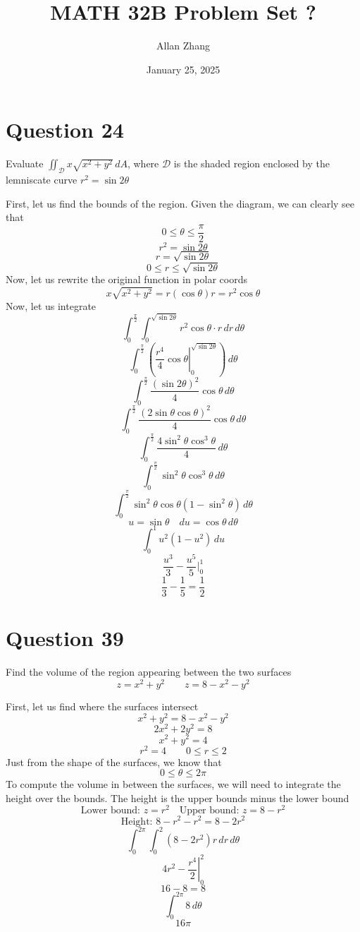\documentclass[hidelinks]{article}
\title{\textbf{MATH 32B Problem Set ?}}
\author{Allan Zhang}
\date{January 25, 2025}
\begin{document}
\hypersetup{bookmarksnumbered=true,}
\pagecolor{white}
\color{black}
\maketitle

\section{Question 24}
Evaluate $\iint_{\mathcal{D}} x \sqrt{x^2+y^2} \, dA$, where $\mathcal{D}$ is the shaded region enclosed by the lemniscate curve $r^2 = \sin2\theta$
\vspace{0.2cm}

First, let us find the bounds of the region. Given the diagram, we can clearly see that 
\[
    0 \leq \theta \leq \frac{\pi}{2}
\]
\[
    r^2 = \sin2\theta
\]
\[
    r = \sqrt{\sin2\theta} 
\]
\[
    0 \leq r \leq \sqrt{\sin2\theta}
\]
Now, let us rewrite the original function in polar coords
\[
    x\sqrt{x^2+y^2} = r(\cos\theta) r = r^2 \cos\theta
\]
Now, let us integrate
\[
    \int_0^{\frac{\pi}{2}} \int_0^{\sqrt{\sin2\theta}} r^2 \cos\theta \cdot r \, dr \, d \theta
\]
\[
    \int_0^{\frac{\pi}{2}} \left ( \left . \frac{r^4}{4} \cos\theta \right |_0^{\sqrt{\sin2\theta}}  \right ) \, d \theta
\]
\[
    \int_0^{\frac{\pi}{2}} \frac{(\sin2\theta)^2}{4} \cos\theta \, d \theta
\]
\[ 
    \int_0^{\frac{\pi}{2}} \frac{(2\sin\theta\cos\theta)^2}{4} \cos\theta \, d \theta
\]
\[ 
    \int_0^{\frac{\pi}{2}} \frac{4\sin^2\theta\cos^3\theta}{4} \, d \theta
\]
\[ 
    \int_0^{\frac{\pi}{2}} \sin^2\theta\cos^3\theta \, d \theta
\]
\[
    \int_0^{\frac{\pi}{2}} \sin^2\theta\cos\theta(1-\sin^2\theta) \, d \theta
\]
\[
    u = \sin\theta \quad du = \cos\theta \, d\theta
\]
\[
    \int_0^1 u^2 (1-u^2) \, du
\]
\[
    \frac{u^3}{3} - \frac{u^5}{5} \Big |_0^1
\]
\[
    \frac{1}{3} - \frac{1}{5} = \frac{1}{2}
\]
\newpage
\section{Question 39}
Find the volume of the region appearing between the two surfaces
\[
    z = x^2+y^2 \quad \quad z = 8 - x^2-y^2
\]
\vspace{0.2cm}

First, let us find where the surfaces intersect
\[
    x^2+y^2 = 8 - x^2-y^2
\]
\[
    2x^2+2y^2 = 8
\]
\[
    x^2+y^2 = 4
\]
\[
    r^2 = 4 \quad \quad 0 \leq r \leq 2
\]
Just from the shape of the surfaces, we know that
\[
    0 \leq \theta \leq 2\pi
\]
To compute the volume in between the surfaces, we will need to integrate the height over the bounds. The height is the upper bounds minus the lower bound
\[
    \text{Lower bound: } z = r^2 \quad \text{Upper bound: } z = 8-r^2
\]
\[
    \text{Height: } 8-r^2 - r^2 = 8-2r^2
\]
\[
    \int_0^{2\pi} \int_0^2 (8-2r^2) r \, dr \, d\theta
\]
\[
   \left . 4r^2 - \frac{r^4}{2} \right |_0^2
\]
\[
    16 - 8 = 8 
\]
\[
    \int_0^{2\pi} 8 \, d\theta
\]
\[
16 \pi
\]
\end{document}
